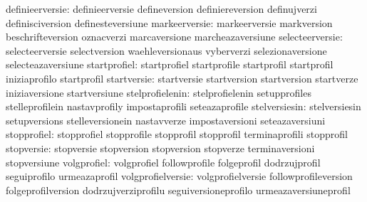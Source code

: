                  definieerversie: definieerversie                  defineversion
                                  definiereversion                 definujverzi
                                  definisciversion                 definesteversiune
                   markeerversie: markeerversie                    markversion
                                  beschrifteversion                oznacverzi
                                  marcaversione                    marcheazaversiune %
                 selecteerversie: selecteerversie                  selectversion
                                  waehleversionaus                 vyberverzi
                                  selezionaversione                selecteazaversiune %
                    startprofiel: startprofiel                     startprofile
                                  startprofil                      startprofil
                                  iniziaprofilo                    startprofil
                     startversie: startversie                      startversion
                                  startversion                     startverze
                                  iniziaversione                   startversiune
                 stelprofielenin: stelprofielenin                  setupprofiles
                                  stelleprofilein                  nastavprofily
                                  impostaprofili                   seteazaprofile
                   stelversiesin: stelversiesin                    setupversions
                                  stelleversionein                 nastavverze
                                  impostaversioni                  seteazaversiuni
                     stopprofiel: stopprofiel                      stopprofile
                                  stopprofil                       stopprofil
                                  terminaprofili                   stopprofil
                      stopversie: stopversie                       stopversion
                                  stopversion                      stopverze
                                  terminaversioni                  stopversiune
                     volgprofiel: volgprofiel                      followprofile
                                  folgeprofil                      dodrzujprofil
                                  seguiprofilo                     urmeazaprofil
               volgprofielversie: volgprofielversie                followprofileversion
                                  folgeprofilversion               dodrzujverziprofilu
                                  seguiversioneprofilo             urmeazaversiuneprofil
